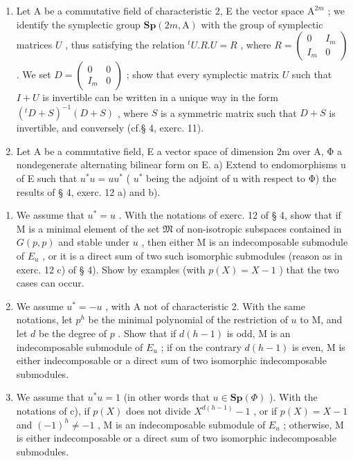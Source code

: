 \begin{enumerate}
\def\labelenumi{\arabic{enumi})}
\setcounter{enumi}{13}
\item
  Let A be a commutative field of characteristic 2, E the vector space \(\mathrm{A}^{2m}\) ; we identify the symplectic group \(\mathbf{Sp}(2m,\mathrm{A})\) with the group of symplectic matrices \(U\) , thus satisfying the relation \(^t U.R.U = R\) , where \(R = \left( \begin{array}{cc}0 & I_m\\ I_m & 0 \end{array} \right)\) . We set \(D = \left( \begin{array}{cc}0 & 0\\ I_m & 0 \end{array} \right)\) ; show that every symplectic matrix \(U\) such that \(I + U\) is invertible can be written in a unique way in the form \((^t D + S)^{-1}(D + S)\) , where \(S\) is a symmetric matrix such that \(D + S\) is invertible, and conversely (cf.§ 4, exerc. 11).
\item
  Let A be a commutative field, E a vector space of dimension 2m over A, Φ a nondegenerate alternating bilinear form on E. a) Extend to endomorphisms u of E such that \(u^{*}u = uu^{*}\) ( \(u^{*}\) being the adjoint of u with respect to Φ) the results of § 4, exerc. 12 a) and b).
\end{enumerate}

\begin{enumerate}
\def\labelenumi{\alph{enumi})}
\setcounter{enumi}{1}
\item
  We assume that \(u^{*} = u\) . With the notations of exerc. 12 of § 4, show that if M is a minimal element of the set \(\mathfrak{M}\) of non-isotropic subspaces contained in \(G(p, p)\) and stable under \(u\) , then either M is an indecomposable submodule of \(E_{u}\) , or it is a direct sum of two such isomorphic submodules (reason as in exerc. 12 c) of § 4). Show by examples (with \(p(X) = X - 1\) ) that the two cases can occur.
\item
  We assume \(u^* = -u\) , with A not of characteristic 2. With the same notations, let \(p^h\) be the minimal polynomial of the restriction of \(u\) to M, and let \(d\) be the degree of \(p\) . Show that if \(d(h - 1)\) is odd, M is an indecomposable submodule of \(E_u\) ; if on the contrary \(d(h - 1)\) is even, M is either indecomposable or a direct sum of two isomorphic indecomposable submodules.
\item
  We assume that \(u^{*}u = 1\) (in other words that \(u \in \mathbf{Sp}(\Phi)\) ). With the notations of c), if \(p(X)\) does not divide \(X^{d(h-1)} - 1\) , or if \(p(X) = X - 1\) and \((-1)^{h} \neq -1\) , M is an indecomposable submodule of \(E_{u}\) ; otherwise, M is either indecomposable or a direct sum of two isomorphic indecomposable submodules.
\end{enumerate}

